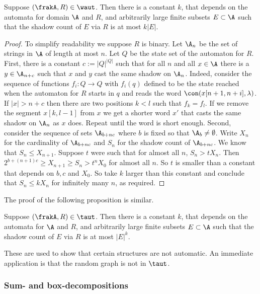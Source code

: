 \begin{proposition}
Suppose $(\frakA,R) \in \waut$.
Then there is a constant $k$,  that depends on the automata for domain ${\A}$ and $R$, and arbitrarily large finite subsets $E \subset {\A}$ such
that the shadow count of $E$ via $R$ is at most $k|E|$.
\end{proposition}

\begin{proof} To simplify readability we suppose $R$ is binary.
Let $\A_n$ be the set of strings in ${\A}$ of length at most $n$. Let $Q$ be the state set of the automaton for $R$. 
First,  there is a constant $c := |Q|^{|Q|}$ such that for all $n$ and all $x \in {\A}$ there is a 
$y \in \A_{n+c}$ such that $x$ and $y$ cast the same shadow on $\A_n$. Indeed, consider the sequence of functions $f_i:Q \to Q$
with $f_i(q)$ defined to be the state reached when the automaton for $R$ starts in $q$ and reads the
word $\con(x[n+1,n+i],\lambda)$.  If $|x| > n + c$ then there are two positions  $k < l$ such that $f_k = f_l$. If we remove the segment $x[k,l-1]$ from $x$ we
get a shorter word $x'$ that casts the same shadow on $\A_n$ as $x$ does. Repeat until the word is short enough.
Second, consider the sequence of sets
$\A_{b+nc}$ where $b$ is fixed so that $\A_b \neq \emptyset$. Write $X_n$ for the cardinality of $\A_{b+nc}$ and $S_n$ for the shadow count of $\A_{b+nc}$. 
We know that $S_n \leq X_{n+1}$. Suppose $t$ were such that for almost all $n$, $S_n > t X_n$.  Then $2^{b+(n+1)c} \geq X_{n+1} \geq S_n > t^n X_0$ for almost all $n$. So  $t$ is smaller than a constant that depends on $b,c$ and $X_0$. So take $k$ larger than this constant and conclude that $S_n \leq k X_n$ for infinitely many $n$, as required.
\end{proof}

The proof of the following proposition is similar.
\begin{proposition}
Suppose $(\frakA,R) \in \taut$.
Then there is a constant $k$, 
that depends on the automata for $\A$ and $R$, and arbitrarily large finite subsets $E \subset {\A}$ such
that the shadow count of $E$ via $R$  is at most $|E|^k$.
\end{proposition}

These are used to show that certain structures are not automatic. An immediate application is that the random graph is not in $\taut$.

\subsubsection*{Sum- and box-decompositions}

